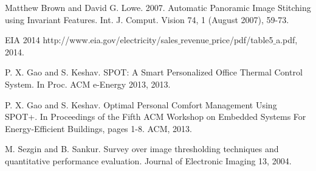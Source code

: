 \documentclass{sig-alternate}
\begin{document}
\begin{thebibliography}{9}
  Matthew Brown and David G. Lowe. 2007. Automatic Panoramic Image Stitching using Invariant Features. Int. J. Comput. Vision 74, 1 (August 2007), 59-73.

 EIA 2014  http://www.eia.gov/electricity/sales$\_$revenue$\_$price/pdf/table5$\_$a.pdf, 2014.

 P. X. Gao and S. Keshav. SPOT: A Smart Personalized Office Thermal Control System. In Proc. ACM e-Energy 2013, 2013.

 P. X. Gao and S. Keshav. Optimal Personal Comfort Management Using SPOT+. In Proceedings of the Fifth ACM Workshop on Embedded Systems For Energy-Efficient Buildings, pages 1-8. ACM, 2013.

 M. Sezgin and B. Sankur. Survey over image thresholding techniques and quantitative performance evaluation. Journal of Electronic Imaging 13, 2004.

\end{thebibliography}
\end{document}
